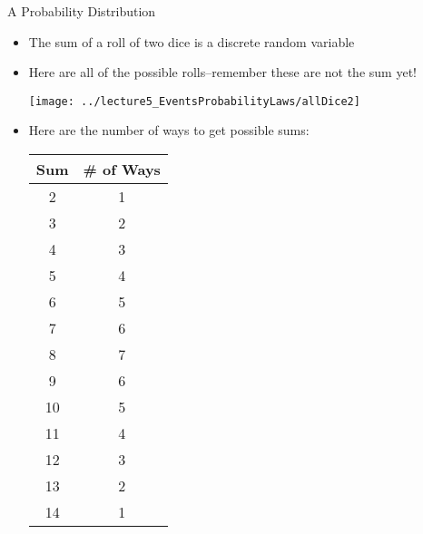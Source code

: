 \documentclass[xcolor=dvipsnames]{beamer}
\begin{document}
\begin{frame}{A Probability Distribution}
	\begin{itemize}
		\item The sum of a roll of two dice is a discrete random variable \pause
		\item Here are all of the possible rolls--remember these are not the sum yet! \pause
		\begin{center}
			\texttt{[image: ../lecture5\_EventsProbabilityLaws/allDice2]}
		\end{center} \pause
		\item Here are the number of ways to get possible sums:
		{ \tiny
		\begin{center}
			\begin{tabular}{|c|c|} \hline
					\textbf{Sum} & \textbf{\# of Ways} \\ \hline \hline
				      2 &    1\\ \hline
				     3  &   2\\ \hline
				     4  &   3\\ \hline
				     5  &   4\\ \hline
				     6  &   5\\ \hline
				     7  &   6\\ \hline
				     8  &   7\\ \hline
				     9  &   6\\ \hline
				    10  &   5\\ \hline
				    11  &   4\\ \hline
				    12  &   3\\ \hline
				    13  &   2\\ \hline
				    14  &   1\\ \hline
			\end{tabular}
		\end{center}}
	\end{itemize}
\end{frame}
\end{document}
